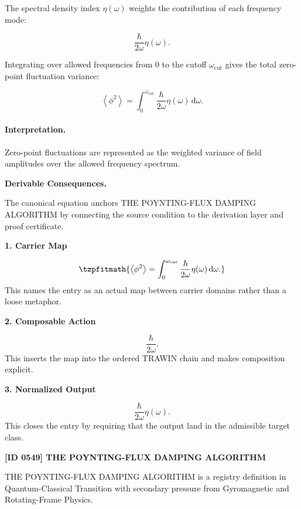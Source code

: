 The spectral density index $\eta(\omega)$ weights the contribution of each frequency mode:

\begin{equation}
\frac{\hbar}{2\omega}\eta(\omega).
\end{equation}

Integrating over allowed frequencies from $0$ to the cutoff $\omega_{\mathrm{cut}}$ gives the total zero-point fluctuation variance:

\begin{equation}
\boxed{
\left\langle\phi^2\right\rangle
=
\int_{0}^{\omega_{\mathrm{cut}}}
\frac{\hbar}{2\omega}
\eta(\omega)
\,\mathrm{d}\omega .
}
\end{equation}

\paragraph{Interpretation.}
Zero-point fluctuations are represented as the weighted variance of field amplitudes over the allowed frequency spectrum.

\par\vspace{0.35em}
\noindent\textbf{Derivable Consequences.}\quad
\begingroup
\footnotesize
\raggedright
The canonical equation anchors THE POYNTING-FLUX DAMPING ALGORITHM by connecting the source condition to the derivation layer and proof certificate.
\par\endgroup

\noindent\textbf{1. Carrier Map}\par
\[
\tzpfitmath{\left\langle\phi^2\right\rangle = \int_{0}^{\omega_{\mathrm{cut}}} \frac{\hbar}{2\omega} \eta(\omega) \,\mathrm{d}\omega.}
\]
\noindent This names the entry as an actual map between carrier domains rather than a loose metaphor.\par
\noindent\textbf{2. Composable Action}\par
\[
\frac{\hbar}{2\omega}.
\]
\noindent This inserts the map into the ordered TRAWIN chain and makes composition explicit.\par
\noindent\textbf{3. Normalized Output}\par
\[
\frac{\hbar}{2\omega}\eta(\omega).
\]
\noindent This closes the entry by requiring that the output land in the admissible target class.\par

\clearpage
\noindent\textbf{[ID 0549] THE POYNTING-FLUX DAMPING ALGORITHM}\par
\vspace{0.35em}
\begingroup\small
{}
THE POYNTING-FLUX DAMPING ALGORITHM is a registry definition in Quantum-Classical Transition with secondary pressure from Gyromagnetic and Rotating-Frame Physics.

